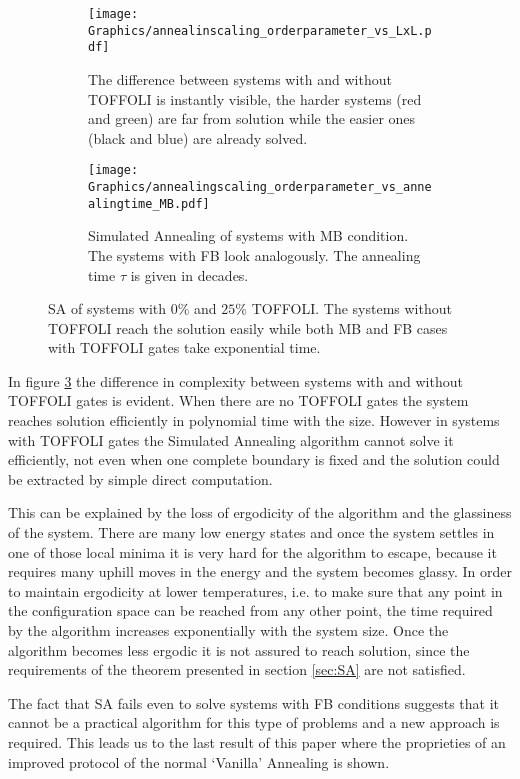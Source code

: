 \begin{figure}[hbtp]
  \begin{subfigure}{.5\textwidth}
    \texttt{[image: Graphics/annealinscaling\_orderparameter\_vs\_LxL.pdf]}
    \caption{The difference between systems with and without TOFFOLI is instantly visible, the harder systems (red and green) are far from solution while the easier ones (black and blue) are already solved.}
    \label{fig:annscal_ordpar_LxL}
  \end{subfigure}
  \begin{subfigure}{.5\textwidth}
    \texttt{[image: Graphics/annealingscaling\_orderparameter\_vs\_annealingtime\_MB.pdf]}
    \caption{Simulated Annealing of systems with MB condition. The systems with FB look analogously. The annealing time $\tau$ is given in decades.}
    \label{fig:annscal_ordpar_anntime}
  \end{subfigure}
  \caption{SA of systems with $0\%$ and $25\%$ TOFFOLI. The systems without TOFFOLI reach the solution easily while both MB and FB cases with TOFFOLI gates take exponential time.}
  \label{fig:annealingscaling}
\end{figure}

In figure \ref{fig:annealingscaling} the difference in complexity between systems with and without TOFFOLI gates is evident.
When there are no TOFFOLI gates the system reaches solution efficiently in polynomial time with the size.
However in systems with TOFFOLI gates the Simulated Annealing algorithm cannot solve it efficiently, not even when one complete boundary is fixed and the solution could be extracted by simple direct computation.

This can be explained by the loss of ergodicity of the algorithm and the glassiness of the system.
There are many low energy states and once the system settles in one of those local minima it is very hard for the algorithm to escape, because it requires many uphill moves in the energy and the system becomes glassy.
In order to maintain ergodicity at lower temperatures, i.e. to make sure that any point in the configuration space can be reached from any other point, the time required by the algorithm increases exponentially with the system size.
Once the algorithm becomes less ergodic it is not assured to reach solution, since the requirements of the theorem presented in section \ref{sec:SA} are not satisfied.

The fact that SA fails even to solve systems with FB conditions suggests that it cannot be a practical algorithm for this type of problems and a new approach is required.
This leads us to the last result of this paper where the proprieties of an improved protocol of the normal `Vanilla' Annealing is shown.

